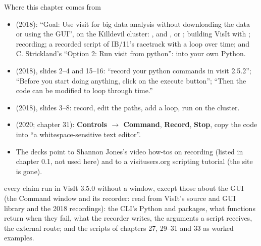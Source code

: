 \documentclass[aspectratio=169,11pt]{beamer}
\newcommand{\gui}[1]{\textsf{\textbf{#1}}}
\begin{document}
\begin{frame}{Where this chapter comes from}
\label{fr:sources}
\scriptsize
\begin{itemize}
  \item {} (2018): ``Goal: Use visit for big data analysis without downloading the data or using the GUI'', on the Killdevil cluster: ,  and , or ; building VisIt with ; recording; a recorded script of IB/11's racetrack with a loop over time; and C. Strickland's ``Option 2: Run visit from python'':  into your own Python.
  \item {} (2018), slides 2--4 and 15--16: ``record your python commands in visit 2.5.2''; ``Before you start doing anything, click on the execute button''; ``Then the code can be modified to loop through time.''
  \item {} (2018), slides 3--8: record, edit the paths, add a loop, run on the cluster.
  \item {} (2020; chapter 31): \gui{Controls $\to$ Command}, \gui{Record}, \gui{Stop}, copy the code into ``a whitespace-sensitive text editor''.
  \item The decks point to Shannon Jones's video how-tos on recording (listed in chapter 0.1, not used here) and to a visitusers.org scripting tutorial (the site is gone).
\end{itemize}
 every claim run in VisIt 3.5.0 without a window, except those about the GUI (the Command window and its recorder: read from VisIt's source and GUI library and the 2018 recordings): the CLI's Python and packages, what functions return when they fail, what the recorder writes, the arguments a script receives, the external  route; and the scripts of chapters 27, 29--31 and 33 as worked examples.
\end{frame}
\end{document}
